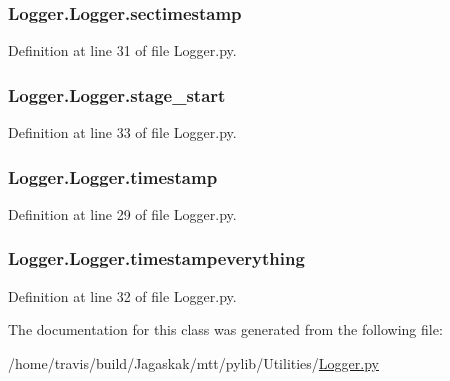\hypertarget{classLogger_1_1Logger_a9d1172c2a7abb0264b9e41368475ffe7}{
\subsubsection[{sectimestamp}]{\setlength{\rightskip}{0pt plus 5cm}Logger.\-Logger.\-sectimestamp}}\label{classLogger_1_1Logger_a9d1172c2a7abb0264b9e41368475ffe7}


Definition at line 31 of file Logger.\-py.

\hypertarget{classLogger_1_1Logger_a639adf5e0d4f73bdb942e9652903231f}{
\subsubsection[{stage\-\_\-start}]{\setlength{\rightskip}{0pt plus 5cm}Logger.\-Logger.\-stage\-\_\-start}}\label{classLogger_1_1Logger_a639adf5e0d4f73bdb942e9652903231f}


Definition at line 33 of file Logger.\-py.

\hypertarget{classLogger_1_1Logger_af1d68b73fec8eebd0abeafa3bc8fd98b}{
\subsubsection[{timestamp}]{\setlength{\rightskip}{0pt plus 5cm}Logger.\-Logger.\-timestamp}}\label{classLogger_1_1Logger_af1d68b73fec8eebd0abeafa3bc8fd98b}


Definition at line 29 of file Logger.\-py.

\hypertarget{classLogger_1_1Logger_a6012f50ab21e5ab3b89465a972b6a99d}{
\subsubsection[{timestampeverything}]{\setlength{\rightskip}{0pt plus 5cm}Logger.\-Logger.\-timestampeverything}}\label{classLogger_1_1Logger_a6012f50ab21e5ab3b89465a972b6a99d}


Definition at line 32 of file Logger.\-py.



The documentation for this class was generated from the following file\-:\begin{DoxyCompactItemize}
\item 
/home/travis/build/\-Jagaskak/mtt/pylib/\-Utilities/\hyperlink{Logger_8py}{Logger.\-py}\end{DoxyCompactItemize}
